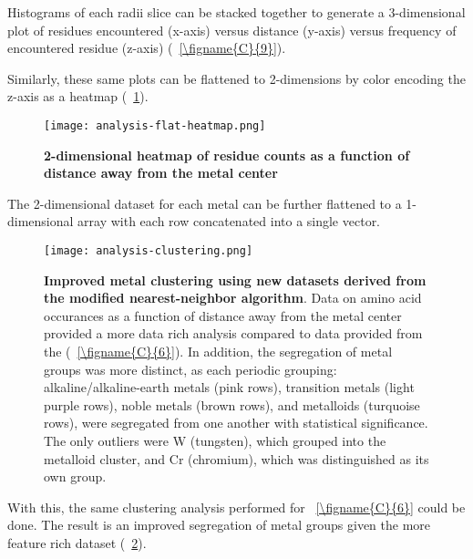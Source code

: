 \documentclass[../main/main]{subfiles}
\begin{document}
Histograms of each radii slice can be stacked together to generate a 3-dimensional plot of residues encountered (x-axis) versus distance (y-axis) versus frequency of encountered residue (z-axis) (\FIGURE~\ref{\figname{C}{9}}).

Similarly, these same plots can be flattened to 2-dimensions by color encoding the z-axis as a heatmap (\FIGURE~\ref{\figname{C}{10}}).

\begin{figure}[H]
	\centering
	\texttt{[image: analysis-flat-heatmap.png]}
	\caption[2-dimensional heatmap of residue counts as a function of distance away from the metal center]
	{
		\textbf{2-dimensional heatmap of residue counts as a function of distance away from the metal center}
	}
	\label{\figname{C}{10}}
\end{figure}

The 2-dimensional dataset for each metal can be further flattened to a 1-dimensional array with each row concatenated into a single vector.

\begin{figure}[H]
	\centering
	\texttt{[image: analysis-clustering.png]}
	\caption[Improved metal clustering using new datasets derived from the modified nearest-neighbor algorithm]
	{
		\textbf{Improved metal clustering using new datasets derived from the modified nearest-neighbor algorithm}.
		Data on amino acid occurances as a function of distance away from the metal center provided a more data rich analysis compared to data provided from the \mPDB{} (\FIGURE~\ref{\figname{C}{6}}). In addition, the segregation of metal groups was more distinct, as each periodic grouping: alkaline/alkaline-earth metals (pink rows), transition metals (light purple rows), noble metals (brown rows), and metalloids (turquoise rows), were segregated from one another with statistical significance. The only outliers were W (tungsten), which grouped into the metalloid cluster, and Cr (chromium), which was distinguished as its own group.
	}
	\label{\figname{C}{11}}
\end{figure}

\noindent With this, the same clustering analysis performed for \FIGURE~\ref{\figname{C}{6}} could be done. The result is an improved segregation of metal groups given the more feature rich dataset (\FIGURE~\ref{\figname{C}{11}}).
\end{document}
